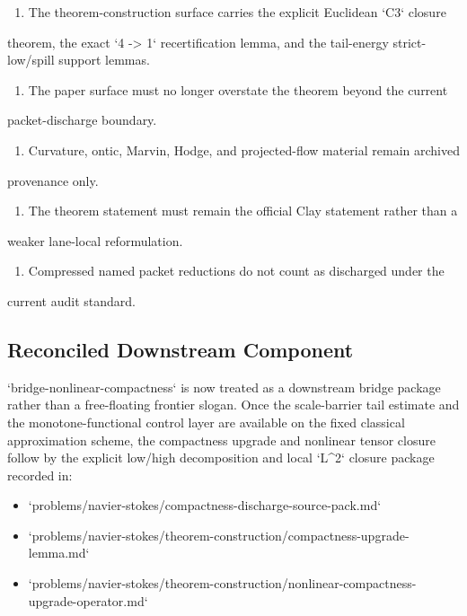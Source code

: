 \begin{enumerate}
\item The theorem-construction surface carries the explicit Euclidean `C3` closure
\end{enumerate}
   theorem, the exact `4 -> 1` recertification lemma, and the tail-energy
   strict-low/spill support lemmas.
\begin{enumerate}
\item The paper surface must no longer overstate the theorem beyond the current
\end{enumerate}
   packet-discharge boundary.
\begin{enumerate}
\item Curvature, ontic, Marvin, Hodge, and projected-flow material remain archived
\end{enumerate}
   provenance only.
\begin{enumerate}
\item The theorem statement must remain the official Clay statement rather than a
\end{enumerate}
   weaker lane-local reformulation.
\begin{enumerate}
\item Compressed named packet reductions do not count as discharged under the
\end{enumerate}
   current audit standard.

\subsection{Reconciled Downstream Component}

`bridge-nonlinear-compactness` is now treated as a downstream bridge package rather than a free-floating frontier slogan. Once the scale-barrier tail estimate and the monotone-functional control layer are available on the fixed classical approximation scheme, the compactness upgrade and nonlinear tensor closure follow by the explicit low/high decomposition and local `L\textasciicircum{}2` closure package recorded in:

\begin{itemize}
\item `problems/navier-stokes/compactness-discharge-source-pack.md`
\item `problems/navier-stokes/theorem-construction/compactness-upgrade-lemma.md`
\item `problems/navier-stokes/theorem-construction/nonlinear-compactness-upgrade-operator.md`
\end{itemize}

